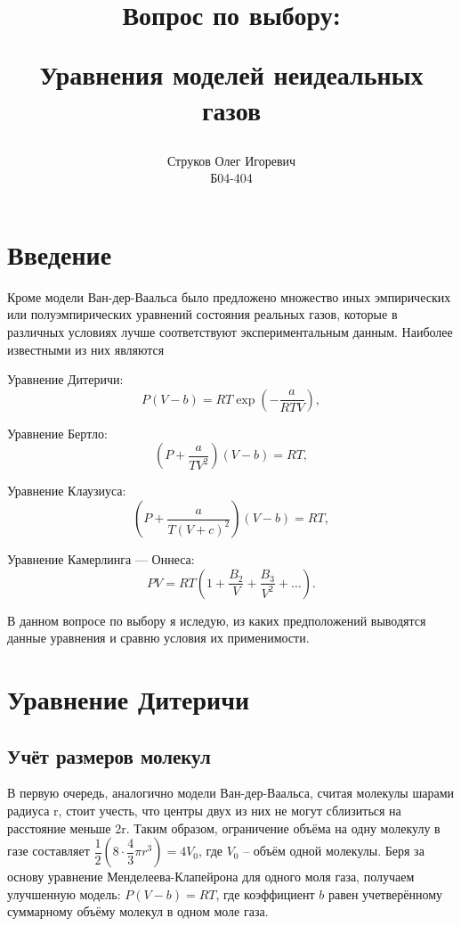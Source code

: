\documentclass[12pt]{article} %
\title{\begin{center}Вопрос по выбору:\end{center}
Уравнения моделей неидеальных газов}
\author{Струков Олег Игоревич \\ Б04-404}
\date{}
\begin{document}
    \maketitle
    \newpage

\section*{Введение}

Кроме модели Ван-дер-Ваальса было предложено множество иных эмпирических или полуэмпирических уравнений состояния реальных газов, которые в различных условиях лучше соответствуют экспериментальным данным. Наиболее известными из них являются

Уравнение Дитеричи:
\begin{equation}
P(V - b) = RT \exp\left(-\frac{a}{RTV}\right),
\end{equation}

Уравнение Бертло:
\begin{equation}
\left(P + \frac{a}{TV^2}\right)(V - b) = RT,
\end{equation}

Уравнение Клаузиуса:
\begin{equation}
\left(P + \frac{a}{T(V + c)^2}\right)(V - b) = RT,
\end{equation}

Уравнение Камерлинга — Оннеса:
\begin{equation}
PV = RT\left(1 + \frac{B_2}{V} + \frac{B_3}{V^2} + \ldots\right).
\end{equation}

В данном вопросе по выбору я иследую, из каких предположений выводятся данные уравнения и сравню условия их применимости.

\section*{Уравнение Дитеричи}
\subsection*{Учёт размеров молекул}

В первую очередь, аналогично модели Ван-дер-Ваальса, считая молекулы шарами радиуса r, стоит учесть, что центры двух из них не могут сблизиться на расстояние меньше 2r. 
Таким образом, ограничение объёма на одну молекулу в газе составляет $\dfrac{1}{2}\left(8\cdot\dfrac{4}{3}\pi r^3\right) = 4V_0 $, где $V_0$ -- объём одной молекулы.
Беря за основу уравнение Менделеева-Клапейрона для одного моля газа, получаем улучшенную модель: $P(V - b) = RT$, где коэффициент $b$ равен учетверённому суммарному объёму молекул в одном моле газа.
\end{document}
